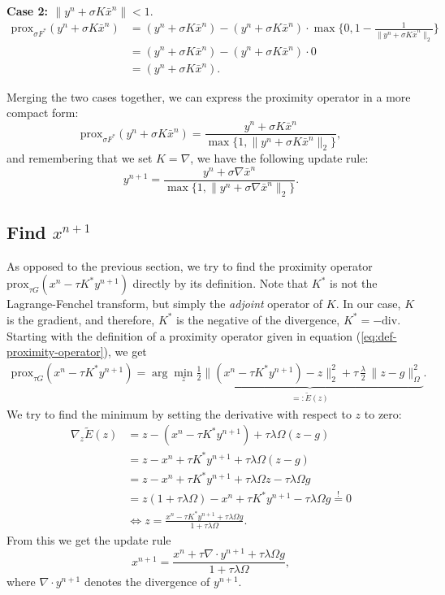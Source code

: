 \documentclass{paper}
\newcommand{\prox}{\text{prox}}
\begin{document}
\textbf{Case 2: $\|y^n + \sigma K \bar x^n\| < 1.$}
\begin{align*}
\prox_{\sigma F^*}(y^n + \sigma K \bar x^n) &=  (y^n + \sigma K \bar x^n) - (y^n + \sigma K \bar x^n) \cdot \max\{0, 1 - \frac{1}{\|y^n + \sigma K \bar x^n\|_2}\} \\
&= (y^n + \sigma K \bar x^n) - (y^n + \sigma K \bar x^n) \cdot 0 \\
&= (y^n + \sigma K \bar x^n).
\end{align*}

Merging the two cases together, we can express the proximity operator in a more compact form:
$$\prox_{\sigma F^*}(y^n + \sigma K \bar x^n) = \frac{y^n + \sigma K \bar x^n}{\max\{1,\|y^n + \sigma K \bar x^n\|_2\}},$$
and remembering that we set $K = \nabla$, we have the following update rule:
$$y^{n+1} = \frac{y^n + \sigma \nabla \bar x^n}{\max\{1,\|y^n + \sigma \nabla \bar x^n\|_2\}}.$$

\subsection{Find $x^{n+1}$}
As opposed to the previous section, we try to find the proximity operator $\prox_{\tau G}(x^n - \tau K^* y^{n+1})$ directly by its definition. Note that $K^*$ is not the Lagrange-Fenchel transform, but simply the \emph{adjoint} operator of $K$. In our case, $K$ is the gradient, and therefore, $K^*$ is the negative of the divergence, $K^* = - \text{div}$. Starting with the definition of a proximity operator given in equation (\ref{eq:def-proximity-operator}), we get 
\begin{align*}
 \prox_{\tau G}(x^n - \tau K^* y^{n+1}) = \arg\min_z \underbrace{\frac{1}{2} \|(x^n - \tau K^* y^{n+1})-z\|_2^2 + \tau \, \frac{\lambda}{2} \, \|z-g\|_\Omega^2}_{=: \tilde E(z)}.
\end{align*}
We try to find the minimum by setting the derivative with respect to $z$ to zero:
\begin{align*}
 \nabla_z \tilde E(z) &= z - (x^n - \tau K^* y^ {n+1}) + \tau \lambda \Omega (z-g) \\
 &= z - x^n + \tau K^* y^{n+1} + \tau \lambda \Omega (z-g) \\
 &= z - x^n + \tau K^* y^{n+1} + \tau \lambda \Omega z -\tau \lambda \Omega g \\
 &= z(1 + \tau \lambda \Omega) - x^n + \tau K^* y^{n+1} - \tau \lambda \Omega g \stackrel{!}{=} 0 \\
 &\Longleftrightarrow z = \frac{x^n - \tau K^* y^{n+1} + \tau \lambda \Omega g}{1 + \tau \lambda \Omega}.
\end{align*}
From this we get the update rule
$$x^{n+1} = \frac{x^n + \tau \nabla \cdot y^{n+1} + \tau \lambda \Omega g}{1 + \tau \lambda \Omega},$$
where $\nabla \cdot y^{n+1}$ denotes the divergence of $y^{n+1}$.
\end{document}
